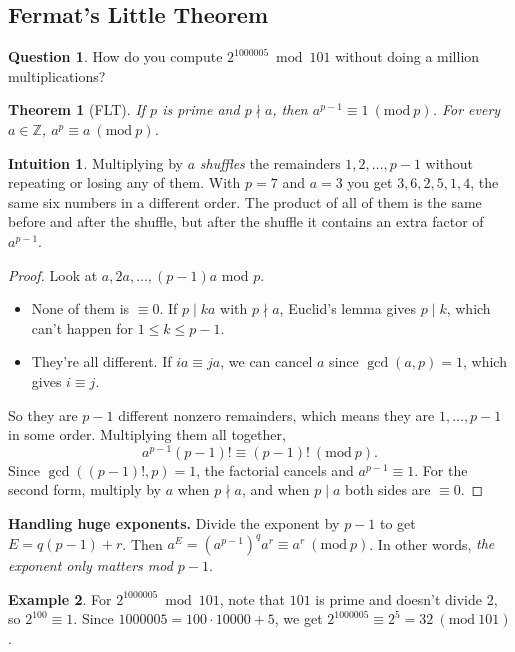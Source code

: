 \documentclass[11pt,a4paper]{article}
\newtheorem{theorem}{Theorem}[section]
\theoremstyle{definition}
\newtheorem{example}[theorem]{Example}
\newcommand{\Z}{\mathbb{Z}}
\newcommand{\md}[1]{\ (\mathrm{mod}\ #1)}
\theoremstyle{noteit}
\newtheorem*{question}{Question}
\theoremstyle{note}
\newtheorem*{intuition}{Intuition}
\begin{document}
\subsection{Fermat's Little Theorem}

\begin{question}
How do you compute $2^{1000005}\bmod101$ without doing a million multiplications?
\end{question}

\begin{theorem}[FLT]
If $p$ is prime and $p\nmid a$, then $a^{p-1}\equiv1\md p$. For every $a\in\Z$, $a^p\equiv a\md p$.
\end{theorem}

\begin{intuition}
Multiplying by $a$ \emph{shuffles} the remainders $1,2,\dots,p-1$ without repeating or losing any of them. With $p=7$ and $a=3$ you get $3,6,2,5,1,4$, the same six numbers in a different order. The product of all of them is the same before and after the shuffle, but after the shuffle it contains an extra factor of $a^{p-1}$.
\end{intuition}

\begin{proof}
Look at $a,2a,\dots,(p-1)a$ mod $p$.
\begin{itemize}
\item None of them is $\equiv0$. If $p\mid ka$ with $p\nmid a$, Euclid's lemma gives $p\mid k$, which can't happen for $1\le k\le p-1$.
\item They're all different. If $ia\equiv ja$, we can cancel $a$ since $\gcd(a,p)=1$, which gives $i\equiv j$.
\end{itemize}
So they are $p-1$ different nonzero remainders, which means they are $1,\dots,p-1$ in some order. Multiplying them all together,
\[
a^{p-1}(p-1)!\equiv(p-1)!\md p.
\]
Since $\gcd((p-1)!,p)=1$, the factorial cancels and $a^{p-1}\equiv1$. For the second form, multiply by $a$ when $p\nmid a$, and when $p\mid a$ both sides are $\equiv0$.
\end{proof}

\textbf{Handling huge exponents.} Divide the exponent by $p-1$ to get $E=q(p-1)+r$. Then $a^E=(a^{p-1})^q a^r\equiv a^r\md p$. In other words, \emph{the exponent only matters mod $p-1$}.

\begin{example}
For $2^{1000005}\bmod101$, note that $101$ is prime and doesn't divide 2, so $2^{100}\equiv1$. Since $1000005=100\cdot10000+5$, we get $2^{1000005}\equiv2^5=32\md{101}$.
\end{example}
\end{document}
